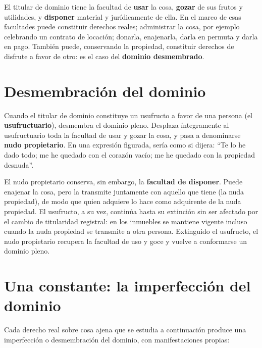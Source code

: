 \documentclass[12pt,oneside]{book}
\begin{document}
El titular de dominio tiene la facultad de \textbf{usar} la cosa, \textbf{gozar} de sus frutos y utilidades, y \textbf{disponer} material y jurídicamente de ella. En el marco de esas facultades puede constituir derechos reales; administrar la cosa, por ejemplo celebrando un contrato de locación; donarla, enajenarla, darla en permuta y darla en pago. También puede, conservando la propiedad, constituir derechos de disfrute a favor de otro: es el caso del \textbf{dominio desmembrado}.

\section{Desmembración del dominio}

Cuando el titular de dominio constituye un usufructo a favor de una persona (el \textbf{usufructuario}), desmembra el dominio pleno. Desplaza íntegramente al usufructuario toda la facultad de usar y gozar la cosa, y pasa a denominarse \textbf{nudo propietario}. En una expresión figurada, sería como si dijera: ``Te lo he dado todo; me he quedado con el corazón vacío; me he quedado con la propiedad desnuda''.

El nudo propietario conserva, sin embargo, la \textbf{facultad de disponer}. Puede enajenar la cosa, pero la transmite juntamente con aquello que tiene (la nuda propiedad), de modo que quien adquiere lo hace como adquirente de la nuda propiedad. El usufructo, a su vez, continúa hasta su extinción sin ser afectado por el cambio de titularidad registral: en los inmuebles se mantiene vigente incluso cuando la nuda propiedad se transmite a otra persona. Extinguido el usufructo, el nudo propietario recupera la facultad de uso y goce y vuelve a conformarse un dominio pleno.

\section{Una constante: la imperfección del dominio}

Cada derecho real sobre cosa ajena que se estudia a continuación produce una imperfección o desmembración del dominio, con manifestaciones propias:
\end{document}
